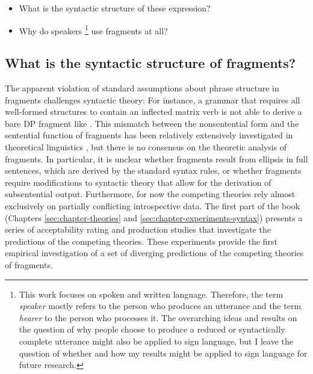 \begin{itemize} \itemsep0em	
 \item What is the syntactic structure of these expression?
 \item Why do speakers%
 \footnote{This work focuses on spoken and written language. Therefore, the term \textit{speaker} mostly refers to the person who produces an utterance and the term \textit{hearer} to the person who processes it. The overarching ideas and results on the question of why people choose to produce a reduced or syntactically complete utterance might also be applied to sign language, but I leave the question of whether and how my results might be applied to sign language for future research.}\afterfn%
 use fragments at all?
\end{itemize}

\subsection{What is the syntactic structure of fragments?}
The apparent violation of standard assumptions about phrase structure in fragments challenges syntactic theory: For instance, a grammar that requires all well-formed structures to contain an inflected matrix verb is not able to derive a bare DP fragment like \Last[a]. This mismatch between the nonsentential form and the sentential function of fragments has been relatively extensively investigated in theoretical linguistics \citep[see e.g.][]{morgan1973, ginzburg.sag2000, fernandez.ginzburg2002, schlangen2003, merchant2004,barton.progovac2005, culicover.jackendoff2005, stainton2006, reich2007, weir2014, ott.struckmeier2016}, but there is no consensus on the theoretic analysis of fragments. In particular, it is unclear whether fragments result from ellipsis in full sentences, which are derived by the standard syntax rules, or whether fragments require modifications to syntactic theory that allow for the derivation of subsentential output. Furthermore, for now the competing theories rely almost exclusively on partially conflicting introspective data. The first part of the book (Chapters \ref{sec:chapter-theories} and \ref{sec:chapter-experiments-syntax}) presents a series of acceptability rating and production studies that investigate the predictions of the competing theories. These experiments provide the first empirical investigation of a set of diverging predictions of the competing theories of fragments.

